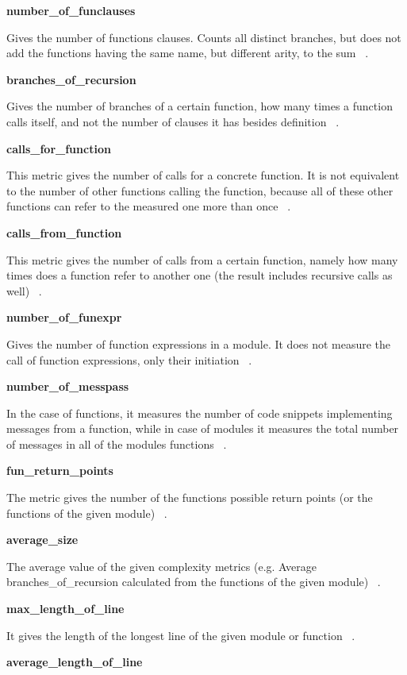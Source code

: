 \textbf{number\_of\_funclauses}

Gives the number of functions clauses. Counts all distinct branches, but does not add the functions having the same name, but different arity, to the sum ~\cite{refactorerlm}.

\textbf{branches\_of\_recursion}

Gives the number of branches of a certain function, how many times a function calls itself, and not the number of clauses it has besides definition ~\cite{refactorerlm}.

\textbf{calls\_for\_function}

This metric gives the number of calls for a concrete function. It is not equivalent to the number of other functions calling the function, because all of these other functions can refer to the measured one more than once ~\cite{refactorerlm}.

\textbf{calls\_from\_function}

This metric gives the number of calls from a certain function, namely how many times does a function refer to another one (the result includes recursive calls as well) ~\cite{refactorerlm}.

\textbf{number\_of\_funexpr}

Gives the number of function expressions in a module. It does not measure the call of function expressions, only their initiation ~\cite{refactorerlm}.

\textbf{number\_of\_messpass}

In the case of functions, it measures the number of code snippets implementing messages from a function, while in case of modules it measures the total number of messages in all of the modules functions ~\cite{refactorerlm}.

\textbf{fun\_return\_points}

The metric gives the number of the functions possible return points (or the functions of the given module) ~\cite{refactorerlm}.

\textbf{average\_size}

The average value of the given complexity metrics (e.g. Average branches\_of\_recursion calculated from the functions of the given module) ~\cite{refactorerlm}.

\textbf{max\_length\_of\_line}

It gives the length of the longest line of the given module or function ~\cite{refactorerlm}.

\textbf{average\_length\_of\_line}

